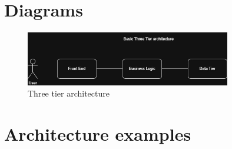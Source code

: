 \documentclass[a4paper, 11pt]{book}
\begin{document}
    \chapter{Diagrams}

    \begin{figure}[h]
        \centering
        \includegraphics[width=0.8\textwidth]{diagrams/basic-architecture} %
        \caption{Three tier architecture}
        \label{fig:drawio-diagram}
    \end{figure}


    \chapter{Architecture examples}
\end{document}
